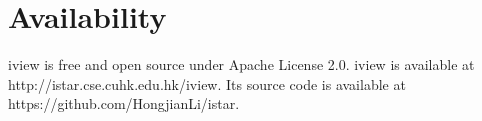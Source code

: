 \documentclass{bioinfo}
\begin{document}
\section{Availability}

iview is free and open source under Apache License 2.0. iview is available at http://istar.cse.cuhk.edu.hk/iview. Its source code is available at https://github.com/HongjianLi/istar.




%
%
%
%
%
%


\end{document}

